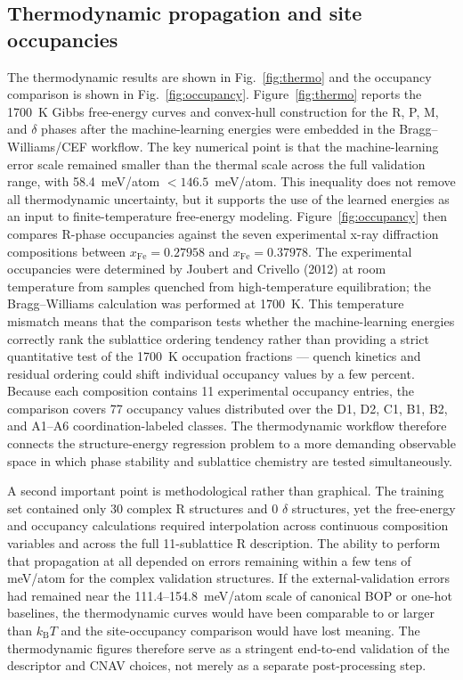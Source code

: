 \documentclass[prb,twocolumn,floatfix]{revtex4-2}
\begin{document}
\subsection{Thermodynamic propagation and site occupancies}

The thermodynamic results are shown in Fig.~\ref{fig:thermo} and the occupancy comparison is shown in Fig.~\ref{fig:occupancy}. Figure~\ref{fig:thermo} reports the 1700~K Gibbs free-energy curves and convex-hull construction for the R, P, M, and $\delta$ phases after the machine-learning energies were embedded in the Bragg--Williams/CEF workflow. The key numerical point is that the machine-learning error scale remained smaller than the thermal scale across the full validation range, with 58.4~meV/atom $<146.5$~meV/atom. This inequality does not remove all thermodynamic uncertainty, but it supports the use of the learned energies as an input to finite-temperature free-energy modeling. Figure~\ref{fig:occupancy} then compares R-phase occupancies against the seven experimental x-ray diffraction compositions between $x_{\mathrm{Fe}}=0.27958$ and $x_{\mathrm{Fe}}=0.37978$. The experimental occupancies were determined by Joubert and Crivello (2012) at room temperature from samples quenched from high-temperature equilibration; the Bragg--Williams calculation was performed at 1700~K. This temperature mismatch means that the comparison tests whether the machine-learning energies correctly rank the sublattice ordering tendency rather than providing a strict quantitative test of the 1700~K occupation fractions — quench kinetics and residual ordering could shift individual occupancy values by a few percent. Because each composition contains 11 experimental occupancy entries, the comparison covers 77 occupancy values distributed over the D1, D2, C1, B1, B2, and A1--A6 coordination-labeled classes. The thermodynamic workflow therefore connects the structure-energy regression problem to a more demanding observable space in which phase stability and sublattice chemistry are tested simultaneously.

A second important point is methodological rather than graphical. The training set contained only 30 complex R structures and 0 $\delta$ structures, yet the free-energy and occupancy calculations required interpolation across continuous composition variables and across the full 11-sublattice R description. The ability to perform that propagation at all depended on errors remaining within a few tens of meV/atom for the complex validation structures. If the external-validation errors had remained near the 111.4--154.8~meV/atom scale of canonical BOP or one-hot baselines, the thermodynamic curves would have been comparable to or larger than $k_{\mathrm{B}}T$ and the site-occupancy comparison would have lost meaning. The thermodynamic figures therefore serve as a stringent end-to-end validation of the descriptor and CNAV choices, not merely as a separate post-processing step.
\end{document}

